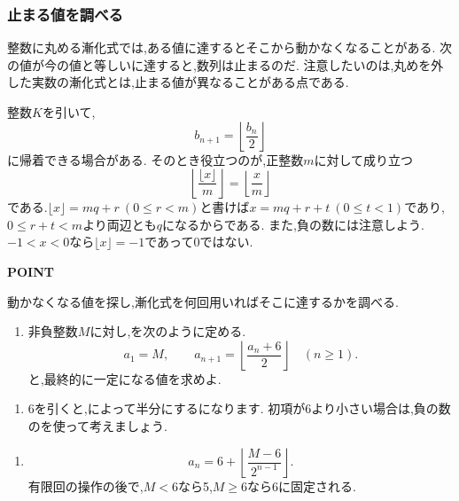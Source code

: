 \subsubsection{止まる値を調べる}\label{節：止まる値を調べる}
整数に丸める漸化式では,ある値に達するとそこから動かなくなることがある.
次の値が今の値と等しいに達すると,数列は止まるのだ.
注意したいのは,丸めを外した実数の漸化式とは,止まる値が異なることがある点である.

整数$K$を引いて,
\[
  b_{n+1}=\left\lfloor\frac{b_n}{2}\right\rfloor
\]
に帰着できる場合がある.
そのとき役立つのが,正整数$m$に対して成り立つ
\[
  \left\lfloor\frac{\lfloor x\rfloor}{m}\right\rfloor
  =\left\lfloor\frac xm\right\rfloor
\]
である.$\lfloor x\rfloor=mq+r\ (0\le r<m)$と書けば$x=mq+r+t\ (0\le t<1)$であり,
$0\le r+t<m$より両辺とも$q$になるからである.
また,負の数には注意しよう.$-1<x<0$なら$\lfloor x\rfloor=-1$であって0ではない.

\begin{bookpoint}
  \textbf{POINT}\par
  動かなくなる値を探し,漸化式を何回用いればそこに達するかを調べる.
\end{bookpoint}

\noindent {}\par\nobreak
\begin{enumerate}[label=(\arabic*),parsep=3pt,beginpenalty=10000,format=\bookitemlink{example-gauss-role-6}{problem}{answer}]
  \item 非負整数$M$に対し,を次のように定める.
    \[
      a_1=M,\qquad
      a_{n+1}=\left\lfloor\frac{a_n+6}{2}\right\rfloor
      \quad(n\ge1).
    \]
    と,最終的に一定になる値を求めよ.
\end{enumerate}

\noindent {}\par\nobreak
\begin{enumerate}[label=(\arabic*),parsep=3pt,beginpenalty=10000,format=\bookitemlink{example-gauss-role-6}{hint}{problem}]
  \item 6を引くと,によって半分にするになります.
    初項が6より小さい場合は,負の数のを使って考えましょう.
\end{enumerate}

\noindent {}\par\nobreak
\begin{enumerate}[label=(\arabic*),parsep=3pt,beginpenalty=10000,format=\bookitemlink{example-gauss-role-6}{answer}{problem}]
  \item \[
      a_n=6+\left\lfloor\frac{M-6}{2^{n-1}}\right\rfloor.
    \]
    有限回の操作の後で,$M<6$なら5,$M\ge6$なら6に固定される.
\end{enumerate}

